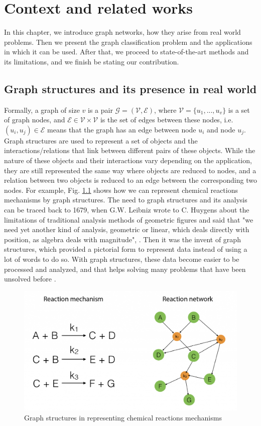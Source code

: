 \addchapheadtotoc
\chapter{Context and related works}
 In this chapter, we introduce graph networks, how they arise from real world problems. Then we present the graph classification problem and the applications in which it can be used. After that, we proceed to state-of-the-art methods and its limitations, and we finish be stating our contribution. 
\section{Graph structures and its presence in real world}
Formally, a graph of size $v$ is a pair $\mathcal{G}=(\mathcal{V},\mathcal{E})$, where $\mathcal{V}=\{u_1,...,u_v\}$ is a set of  graph nodes, and $\mathcal{E}\in \mathcal{V}\times \mathcal{V}$ is the set of edges between these nodes, i.e. $(u_i, u_j)\in \mathcal{E}$ means that the graph has an edge between node $u_i$ and node $u_j$.
Graph structures are used to represent a set of objects and the interactions/relations that link between different pairs of these objects.  While the nature of these objects and their interactions vary depending on the application, they are still represented the same way where objects are reduced to nodes, and a relation between two objects is reduced to an edge between the corresponding two nodes. For example, Fig. \ref{fig:Graph_Example} shows how we can represent chemical reactions mechanisms by  graph structures.\newline
The need to graph structures and its analysis can be traced back to 1679, when G.W.  Leibniz  wrote to C. Huygens about the limitations of traditional analysis methods of geometric figures and said that "we need yet another kind of analysis, geometric or linear, which deals directly with position, as algebra deals with magnitude", \citep{Graph_application}. Then it was the invent of graph structures, which provided a pictorial form to represent data instead of using a lot of words to do so. With graph structures, these data become easier to be processed and analyzed, and that helps solving many problems that have been unsolved before \citep{Graph_application}.
\begin{figure}[H]
\centering
\includegraphics[scale=0.2]{figs/Graph_example.png}
\caption[Graph example to represent Chemical Reactions]{Graph structures in representing chemical reactions mechanisms}
\label{fig:Graph_Example}
\end{figure}
